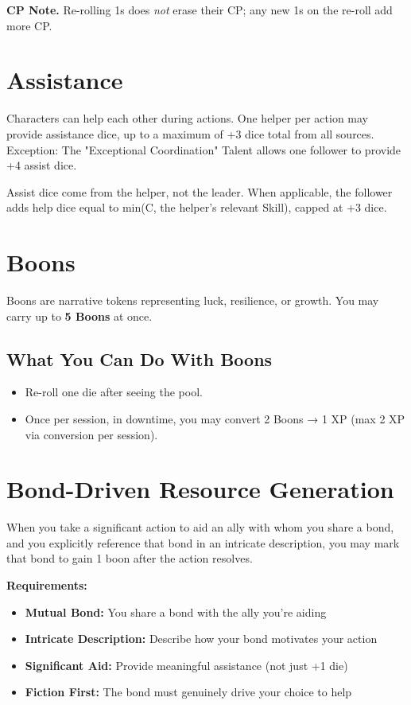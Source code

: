 \noindent\textbf{CP Note.} Re-rolling 1s does \emph{not} erase their CP; any new 1s on the re-roll add more CP.

\section{Assistance}

Characters can help each other during actions. One helper per action may provide assistance dice, up to a maximum of +3 dice total from all sources. Exception: The "Exceptional Coordination" Talent  allows one follower to provide +4 assist dice.

Assist dice come from the helper, not the leader. When applicable, the follower adds help dice equal to min(C, the helper's relevant Skill), capped at +3 dice.

\section{Boons}

Boons are narrative tokens representing luck, resilience, or growth. You may carry up to \textbf{5 Boons} at once.

\subsection*{What You Can Do With Boons}

\begin{itemize}
  \item Re-roll one die after seeing the pool.
  \item Once per session, in downtime, you may convert 2 Boons → 1 XP (max 2 XP via conversion per session).
\end{itemize}

\section{Bond-Driven Resource Generation}

When you take a significant action to aid an ally with whom you share a bond, and you explicitly reference that bond in an intricate description, you may mark that bond to gain 1 boon after the action resolves.

\textbf{Requirements:}
\begin{itemize}
    \item \textbf{Mutual Bond:} You share a bond with the ally you're aiding
    \item \textbf{Intricate Description:} Describe how your bond motivates your action
    \item \textbf{Significant Aid:} Provide meaningful assistance (not just +1 die)
    \item \textbf{Fiction First:} The bond must genuinely drive your choice to help
\end{itemize}

